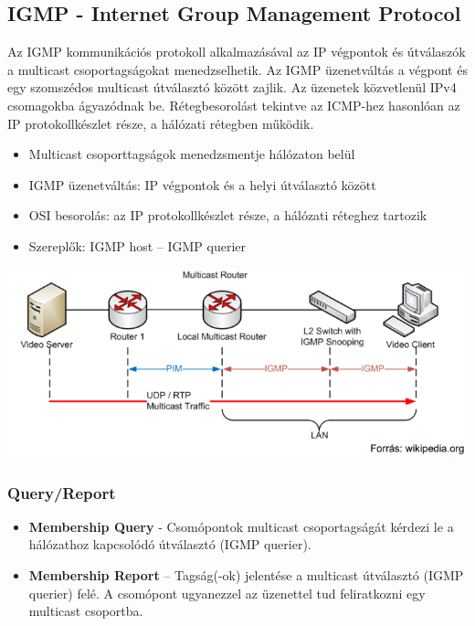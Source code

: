 \documentclass[10pt,a4paper]{article}
\begin{document}
\subsection{IGMP - Internet Group Management Protocol}
Az IGMP kommunikációs protokoll alkalmazásával az IP végpontok és
útválaszók a multicast csoportagságokat menedzselhetik. Az IGMP
üzenetváltás a végpont és egy szomszédos multicast útválasztó között
zajlik. Az üzenetek közvetlenül IPv4 csomagokba ágyazódnak be.
Rétegbesorolást tekintve az ICMP-hez hasonlóan az IP protokollkészlet
része, a hálózati rétegben működik. 
\begin{itemize}
	\item Multicast csoporttagságok menedzsmentje hálózaton
	belül
	\item IGMP üzenetváltás: IP végpontok és a helyi útválasztó
	között
	\item OSI besorolás: az IP protokollkészlet része, a hálózati
	réteghez tartozik
	\item Szereplők: IGMP host – IGMP querier
\end{itemize}
\begin{center}
	\includegraphics[width=0.6\linewidth]{src/IGMP}
\end{center}
\subsubsection{Query/Report}
\begin{itemize}
	\item \textbf{Membership Query} - Csomópontok
	multicast csoportagságát kérdezi le a
	hálózathoz kapcsolódó útválasztó
	(IGMP querier).
	\item  \textbf{Membership Report} – Tagság(-ok) jelentése a multicast útválasztó
	(IGMP querier) felé. A csomópont ugyanezzel az üzenettel tud
	feliratkozni egy multicast csoportba. 
\end{itemize}
\end{document}
